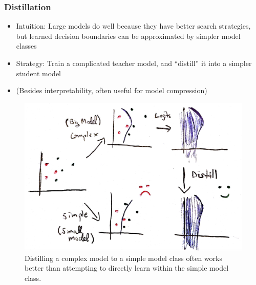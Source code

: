\documentclass[10pt,mathserif]{beamer}
\begin{document}
\begin{frame}
  \frametitle{Distillation}
  \begin{itemize}
  \item Intuition: Large models do well because they have better search
    strategies, but learned decision boundaries can be approximated by simpler
    model classes
  \item Strategy: Train a complicated teacher model, and ``distill'' it into a
    simpler student model
  \item (Besides interpretability, often useful for model compression)
  \end{itemize}
  \begin{figure}[ht]
  \centering
  \includegraphics[width=0.45\paperwidth]{figure/distillation_overview}
  \caption{Distilling a complex model to a simple model class often works better
    than attempting to directly learn within the simple model
    class. \label{fig:distillation_overview} }
\end{figure}
\end{frame}
\end{document}
